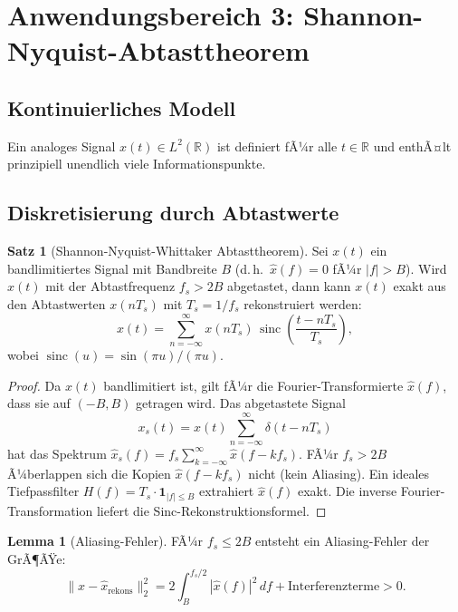 ﻿\documentclass[a4paper,12pt]{article}
\theoremstyle{definition}
\newtheorem{satz}{Satz}
\newtheorem{lemma}{Lemma}
\begin{document}
\section{Anwendungsbereich 3: Shannon-Nyquist-Abtasttheorem}

\subsection{Kontinuierliches Modell}

Ein analoges Signal $x(t) \in L^2(\mathbb{R})$ ist definiert fÃ¼r alle $t \in \mathbb{R}$ und enthÃ¤lt prinzipiell unendlich viele Informationspunkte.

\subsection{Diskretisierung durch Abtastwerte}

\begin{satz}[Shannon-Nyquist-Whittaker Abtasttheorem]
    Sei $x(t)$ ein bandlimitiertes Signal mit Bandbreite $B$ (d.\,h.\ $\hat{x}(f) = 0$ fÃ¼r $|f| > B$). Wird $x(t)$ mit der Abtastfrequenz $f_s > 2B$ abgetastet, dann kann $x(t)$ exakt aus den Abtastwerten $x(nT_s)$ mit $T_s = 1/f_s$ rekonstruiert werden:
    \[
    x(t) = \sum_{n=-\infty}^{\infty} x(nT_s)\,\operatorname{sinc}\!\left(\frac{t - nT_s}{T_s}\right),
    \]
    wobei $\operatorname{sinc}(u) = \sin(\pi u)/(\pi u)$.
\end{satz}

\begin{proof}
    Da $x(t)$ bandlimitiert ist, gilt fÃ¼r die Fourier-Transformierte $\hat{x}(f)$, dass sie auf $(-B, B)$ getragen wird. Das abgetastete Signal
    \[
    x_s(t) = x(t)\sum_{n=-\infty}^\infty \delta(t - nT_s)
    \]
    hat das Spektrum $\hat{x}_s(f) = f_s \sum_{k=-\infty}^\infty \hat{x}(f - kf_s)$. FÃ¼r $f_s > 2B$ Ã¼berlappen sich die Kopien $\hat{x}(f - kf_s)$ nicht (kein Aliasing). Ein ideales Tiefpassfilter $H(f) = T_s \cdot \mathbf{1}_{|f|\leq B}$ extrahiert $\hat{x}(f)$ exakt. Die inverse Fourier-Transformation liefert die Sinc-Rekonstruktionsformel. \qedhere
\end{proof}

\begin{lemma}[Aliasing-Fehler]
    FÃ¼r $f_s \leq 2B$ entsteht ein Aliasing-Fehler der GrÃ¶ÃŸe:
    \[
    \|x - \hat{x}_{\text{rekons}}\|_2^2 = 2\int_B^{f_s/2} |\hat{x}(f)|^2\,df + \text{Interferenzterme} > 0.
    \]
\end{lemma}
\end{document}
